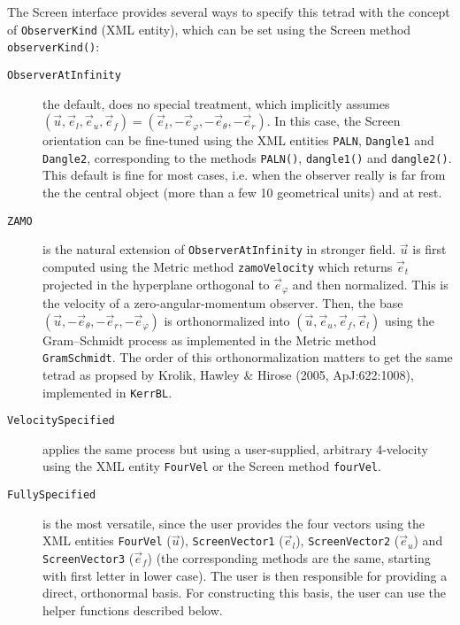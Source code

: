 \documentclass[a4paper,12pt]{article}
\begin{document}
The Screen interface provides several ways to specify this tetrad with
the concept of \texttt{ObserverKind} (XML entity), which can be set
using the Screen method \texttt{observerKind()}:
\begin{description}
\item[\texttt{ObserverAtInfinity}] the default, does no special
  treatment, which implicitly assumes $(\vec u, \vec e_l, \vec e_u,
  \vec e_f) = (\vec e_t, -\vec e_\varphi, -\vec e_\theta, -\vec
  e_r)$. In this case, the Screen orientation can be fine-tuned using
  the XML entities \texttt{PALN}, \texttt{Dangle1} and
  \texttt{Dangle2}, corresponding to the methods \texttt{PALN()},
  \texttt{dangle1()} and \texttt{dangle2()}. This default is fine for
  most cases, i.e. when the observer really is far from the the
  central object (more than a few 10 geometrical units) and at rest.
\item[\texttt{ZAMO}] is the natural extension of
  \texttt{ObserverAtInfinity} in stronger field. $\vec u$ is first
  computed using the Metric method \texttt{zamoVelocity} which returns
  $\vec e_t$ projected in the hyperplane orthogonal to $\vec
  e_\varphi$ and then normalized. This is the velocity of a
  zero-angular-momentum observer. Then, the base $(\vec u, -\vec
  e_\theta, -\vec e_r, -\vec e_\varphi)$ is orthonormalized into
  $(\vec u, \vec e_u, \vec e_f, \vec e_l)$ using the Gram--Schmidt
  process as implemented in the Metric method
  \texttt{GramSchmidt}. The order of this orthonormalization matters
  to get the same tetrad as propsed by Krolik, Hawley \& Hirose (2005,
  ApJ:622:1008), implemented in \texttt{KerrBL}.
\item[\texttt{VelocitySpecified}] applies the same process but using a
  user-supplied, arbitrary 4-velocity using the XML entity
  \texttt{FourVel} or the Screen method \texttt{fourVel}.
\item[\texttt{FullySpecified}] is the most versatile, since the user
  provides the four vectors using the XML entities \texttt{FourVel}
  ($\vec u$), \texttt{ScreenVector1} ($\vec e_l$),
  \texttt{ScreenVector2} ($\vec e_u$) and \texttt{ScreenVector3}
  ($\vec e_f$) (the corresponding methods are the same, starting with
  first letter in lower case). The user is then responsible for
  providing a direct, orthonormal basis. For constructing this basis,
  the user can use the helper functions described below.
\end{description}
\end{document}
